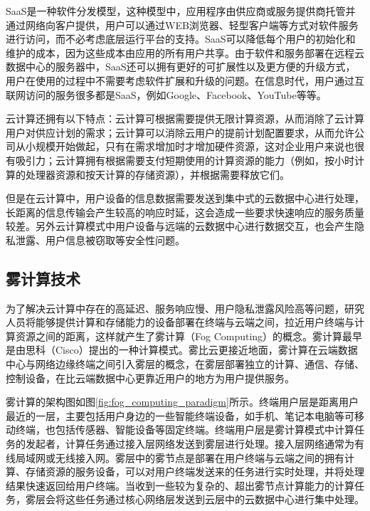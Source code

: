SaaS\cite{amiri2016application, song2017support}是一种软件分发模型，这种模型中，应用程序由供应商或服务提供商托管并通过网络向客户提供，用户可以通过WEB浏览器、轻型客户端等方式对软件服务进行访问，而不必考虑底层运行平台的支持。SaaS可以降低每个用户的初始化和维护的成本，因为这些成本由应用的所有用户共享。由于软件和服务部署在远程云数据中心的服务器中，SaaS还可以拥有更好的可扩展性以及更方便的升级方式，用户在使用的过程中不需要考虑软件扩展和升级的问题。在信息时代，用户通过互联网访问的服务很多都是SaaS，例如Google、Facebook、YouTube等等。

云计算还拥有以下特点：云计算可根据需要提供无限计算资源，从而消除了云计算用户对供应计划的需求；云计算可以消除云用户的提前计划配置要求，从而允许公司从小规模开始做起，只有在需求增加时才增加硬件资源，这对企业用户来说也很有吸引力；云计算拥有根据需要支付短期使用的计算资源的能力（例如，按小时计算的处理器资源和按天计算的存储资源），并根据需要释放它们\cite{fox2009above}。

但是在云计算中，用户设备的信息数据需要发送到集中式的云数据中心进行处理，长距离的信息传输会产生较高的响应时延，这会造成一些要求快速响应的服务质量较差。另外云计算模式中用户设备与远端的云数据中心进行数据交互，也会产生隐私泄露、用户信息被窃取等安全性问题。

\subsection{雾计算技术}

为了解决云计算中存在的高延迟、服务响应慢、用户隐私泄露风险高等问题，研究人员将能够提供计算和存储能力的设备部署在终端与云端之间，拉近用户终端与计算资源之间的距离，这样就产生了雾计算（Fog Computing）的概念。雾计算最早是由思科（Cisco）提出的一种计算模式。雾比云更接近地面，雾计算在云端数据中心与网络边缘终端之间引入雾层的概念，在雾层部署独立的计算、通信、存储、控制设备，在比云端数据中心更靠近用户的地方为用户提供服务\cite{贾维嘉2018雾计算的概念}。

雾计算的架构图如图\ref{fig:fog_computing_paradigm}所示\cite{贾维嘉2018雾计算的概念}。终端用户层是距离用户最近的一层，主要包括用户身边的一些智能终端设备，如手机、笔记本电脑等可移动终端，也包括传感器、智能设备等固定终端。终端用户层是雾计算模式中计算任务的发起者，计算任务通过接入层网络发送到雾层进行处理。接入层网络通常为有线局域网或无线接入网。雾层中的雾节点是部署在用户终端与云端之间的拥有计算、存储资源的服务设备，可以对用户终端发送来的任务进行实时处理，并将处理结果快速返回给用户终端。当收到一些较为复杂的、超出雾节点计算能力的计算任务，雾层会将这些任务通过核心网络层发送到云层中的云数据中心进行集中处理。

